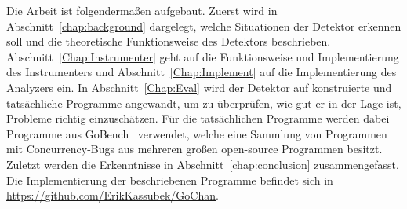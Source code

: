 Die Arbeit ist folgendermaßen aufgebaut. Zuerst wird in Abschnitt~\ref{chap:background}
dargelegt, welche Situationen der Detektor erkennen soll und
die theoretische Funktionsweise des Detektors beschrieben. 
Abschnitt~\ref{Chap:Instrumenter} geht auf die Funktionsweise und Implementierung 
des Instrumenters und Abschnitt~\ref{Chap:Implement} auf die Implementierung 
des Analyzers ein. In Abschnitt~\ref{Chap:Eval} wird der Detektor auf 
konstruierte und tatsächliche Programme angewandt, um zu überprüfen, 
wie gut er in der Lage ist, Probleme richtig einzuschätzen. Für die 
tatsächlichen Programme werden dabei Programme aus GoBench~\cite{gobench}
verwendet, welche eine Sammlung von Programmen mit Concurrency-Bugs aus 
mehreren großen open-source Programmen besitzt. Zuletzt werden die 
Erkenntnisse in Abschnitt~\ref{chap:conclusion} zusammengefasst. Die Implementierung
der beschriebenen Programme befindet sich in \url{https://github.com/ErikKassubek/GoChan}.
